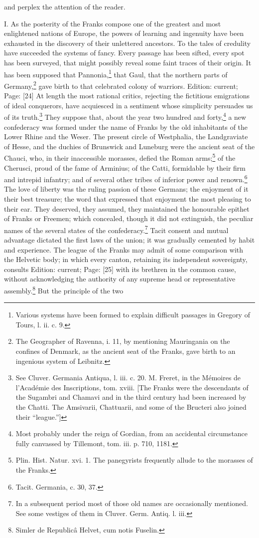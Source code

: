 and perplex the attention of the reader.

I. As the posterity of the Franks compose one of the greatest and most enlightened nations of Europe, the powers of learning and ingenuity have been exhausted in the discovery of their unlettered ancestors. To the tales of credulity have succeeded the systems of fancy. Every passage has been sifted, every spot has been surveyed, that might possibly reveal some faint traces of their origin. It has been supposed that Pannonia,\footnote{Various systems have been formed to explain difficult passages in Gregory of Tours, l. ii. c. 9.} that Gaul, that the northern parts of Germany,\footnote{The Geographer of Ravenna, i. 11, by mentioning Mauringania on the confines of Denmark, as the ancient seat of the Franks, gave birth to an ingenious system of Leibnitz.} gave birth to that celebrated colony of warriors. Edition: current; Page: [24] At length the most rational critics, rejecting the fictitious emigrations of ideal conquerors, have acquiesced in a sentiment whose simplicity persuades us of its truth.\footnote{See Cluver. Germania Antiqua, l. iii. c. 20. M. Freret, in the Mémoires de l\texthebrew{}’Académie des Inscriptions, tom. xviii. [The Franks were the descendants of the Sugambri and Chamavi and in the third century had been increased by the Chatti. The Amsivarii, Chattuarii, and some of the Bructeri also joined their \texthebrew{“}league.\texthebrew{}”]} They suppose that, about the year two hundred and forty,\footnote{Most probably under the reign of Gordian, from an accidental circumstance fully canvassed by Tillemont, tom. iii. p. 710, 1181.} a new confederacy was formed under the name of Franks by the old inhabitants of the Lower Rhine and the Weser. The present circle of Westphalia, the Landgraviate of Hesse, and the duchies of Brunswick and Luneburg were the ancient seat of the Chauci, who, in their inaccessible morasses, defied the Roman arms;\footnote{Plin. Hist. Natur. xvi. 1. The panegyrists frequently allude to the morasses of the Franks.} of the Cherusci, proud of the fame of Arminius; of the Catti, formidable by their firm and intrepid infantry; and of several other tribes of inferior power and renown.\footnote{Tacit. Germania, c. 30, 37.} The love of liberty was the ruling passion of these Germans; the enjoyment of it their best treasure; the word that expressed that enjoyment the most pleasing to their ear. They deserved, they assumed, they maintained the honourable epithet of Franks or Freemen; which concealed, though it did not extinguish, the peculiar names of the several states of the confederacy.\footnote{In a subsequent period most of those old names are occasionally mentioned. See some vestiges of them in Cluver. Germ. Antiq. l. iii.} Tacit consent and mutual advantage dictated the first laws of the union; it was gradually cemented by habit and experience. The league of the Franks may admit of some comparison with the Helvetic body; in which every canton, retaining its independent sovereignty, consults Edition: current; Page: [25] with its brethren in the common cause, without acknowledging the authority of any supreme head or representative assembly.\footnote{Simler de Republicâ Helvet, cum notis Fuselin.} But the principle of the two 